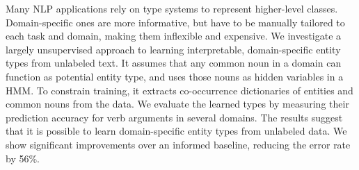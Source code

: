 Many NLP applications rely on type systems to represent higher-level classes. Domain-specific ones are more informative, but have to be manually tailored to each task and domain, making them inflexible and expensive. We investigate a largely unsupervised approach to learning interpretable, domain-specific entity types from unlabeled text. It assumes that any common noun in a domain can function as potential entity type, and uses those nouns as hidden variables in a HMM. To constrain training, it extracts co-occurrence dictionaries of entities and common nouns from the data. We evaluate the learned types by measuring their prediction accuracy for verb arguments in several domains. The results suggest that it is possible to learn domain-specific entity types from unlabeled data. We show significant improvements over an informed baseline, reducing the error rate by 56\%.

